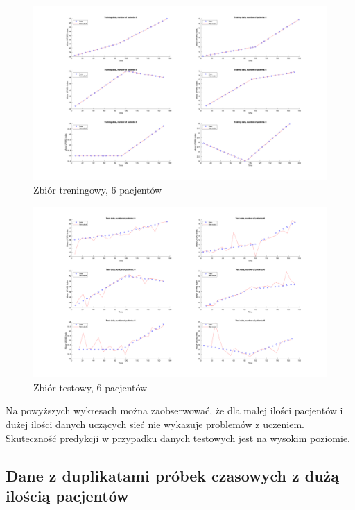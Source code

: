 \documentclass[12pt]{article}
\begin{document}
\begin{figure}[h!]

\includegraphics[width=1.0\textwidth]{training-normal-6.png}
\caption{Zbiór treningowy, 6 pacjentów}

\end{figure}

\begin{figure}[h!]

\includegraphics[width=1.0\textwidth]{test-normal-6.png}
\caption{Zbiór testowy, 6 pacjentów}

\end{figure}

\newpage

Na powyższych wykresach można zaobserwować, że dla małej ilości pacjentów i dużej ilości danych uczących sieć nie wykazuje problemów z uczeniem. Skuteczność predykcji w przypadku danych testowych jest na wysokim poziomie.

\subsection{Dane z duplikatami próbek czasowych z dużą ilością pacjentów}
\end{document}
